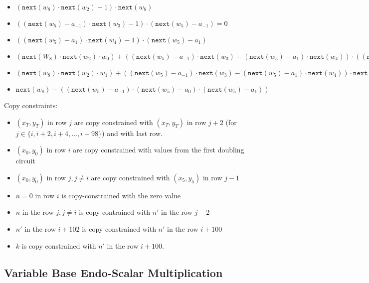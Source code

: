 \begin{itemize}
    \item $(\texttt{next}(w_8) \cdot \texttt{next}(w_2) - 1) \cdot \texttt{next}(w_8)$
    \item $((\texttt{next}(w_5) - a_{-1}) \cdot \texttt{next}(w_3) - 1) \cdot (\texttt{next}(w_5) - a_{-1}) = 0$
    \item $((\texttt{next}(w_5) - a_1) \cdot \texttt{next}(w_4) - 1) \cdot (\texttt{next}(w_5) - a_1)$
	\item $(\texttt{next}(W_8) \cdot \texttt{next}(w_2) \cdot w_0) + ((\texttt{next}(w_5) - a_{-1}) \cdot \texttt{next}(w_3) - (\texttt{next}(w_5) - a_1) \cdot \texttt{next}(w_4)) \cdot ((\texttt{next}(w_5) - a_{-1}) \cdot \texttt{next}(w_3) - (\texttt{next}(w_5) - a_1) \cdot \texttt{next}(w_4)) \cdot \texttt{next}(w_6) - \texttt{next}(w_0) = 0$
    \item $(\texttt{next}(w_8)\cdot \texttt{next}(w_2) \cdot w_1) +((\texttt{next}(w_5) - a_{-1}) \cdot \texttt{next}(w_3) - (\texttt{next}(w_5) - a_1) \cdot \texttt{next}(w_4)) \cdot \texttt{next}(w_7) - \texttt{next}(w_1) = 0$
    \item $\texttt{next}(w_8) - ((\texttt{next}(w_5) - a_{-1}) \cdot (\texttt{next}(w_5) - a_0) \cdot (\texttt{next}(w_5) - a_1))$ 
\end{itemize}    
    Copy constraints:
    \begin{itemize}
    \item $(x_T,y_T)$ in row $j$ are copy constrained with $(x_T,y_T)$ in row $j + 2$ (for $j \in \{i, i + 2, i + 4, \dots, i + 98\}$) and with last row.
    \item $(x_0,y_0)$ in row $i$ are copy constrained with values from the first doubling circuit
    \item $(x_0,y_0)$ in row $j, j \neq i$ are copy constrained with $(x_5,y_5)$ in row $j - 1$ 
    \item $n = 0$ in row $i$ is copy-constrained with the zero value
    \item $n$ in the row $j, j \neq i$ is copy contrained with $n'$ in the row $j-2$
    \item $n'$ in the row $i + 102$ is copy constrained with $n'$ in the row $i + 100$
    \item $k$ is copy constrained with $n'$ in the row $i + 100$.
\end{itemize}

\subsection{Variable Base Endo-Scalar Multiplication}

